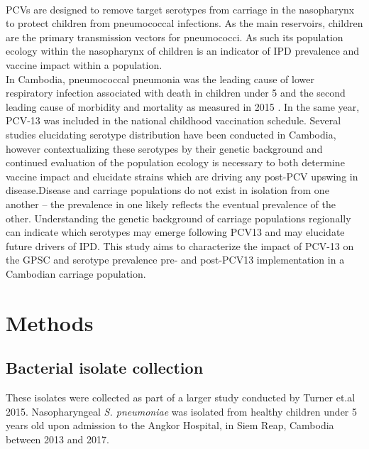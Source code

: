 \documentclass{article}
\begin{document}
\\PCVs are designed to remove target serotypes from carriage in the nasopharynx to protect children from pneumococcal infections. As the main reservoirs, children are the primary transmission vectors \cite{bogaertStreptococcusPneumoniaeColonisation2004,wyllieMolecularSurveillanceStreptococcus2016} for pneumococci. As such its population ecology within the nasopharynx of children is an indicator of IPD prevalence and vaccine impact within a population\cite{hamalubaCrossSectionalObservationalStudy2015}. 
\\In Cambodia, pneumococcal pneumonia was the leading cause of lower respiratory infection associated with death in children under 5 and the second leading cause of morbidity and mortality as measured in 2015 \cite{gbd2015mortalityandcausesofdeathcollaboratorsGlobalRegionalNational2016}. In the same year, PCV-13 was included in the national childhood vaccination schedule. Several studies elucidating serotype distribution have been conducted in Cambodia, however contextualizing these serotypes by their genetic background and continued evaluation of the population ecology is necessary to both determine vaccine impact and elucidate strains which are driving any post-PCV upswing in disease\cite{inghammarSerotypeDistributionClinical2018,turnerPneumococcalInfectionChildren2015,mooreCharacterisationInvasiveStreptococcus2016,turnerImpact13ValentPneumococcal2020}.Disease and carriage populations do not exist in isolation from one another – the prevalence in one likely reflects the eventual prevalence of the other. Understanding the genetic background of carriage populations regionally can indicate which serotypes may emerge following PCV13 and may elucidate future drivers of IPD. This study aims to characterize the impact of PCV-13 on the GPSC and serotype prevalence pre- and post-PCV13 implementation in a Cambodian carriage population. 
\section{Methods}
\subsection{Bacterial isolate collection}
These isolates were collected as part of a larger study conducted by Turner et.al 2015\cite{turnerPneumococcalInfectionChildren2015}. Nasopharyngeal \textit{S. pneumoniae} was isolated from healthy children under 5 years old upon admission to the Angkor Hospital, in Siem Reap, Cambodia between 2013 and 2017. 
\end{document}
